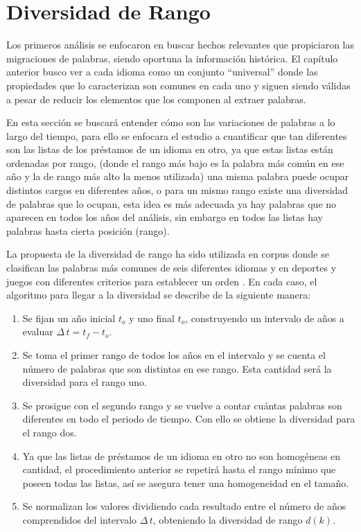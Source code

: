 \chapter{Diversidad de Rango}

Los primeros análisis se enfocaron en buscar hechos relevantes que propiciaron las migraciones de palabras,  siendo oportuna la información histórica.  El capítulo anterior busco ver a cada idioma como un conjunto “universal” donde las propiedades que lo caracterizan  son comunes en cada uno y siguen siendo válidas a pesar de reducir los elementos que los componen al extraer palabras. 

En esta sección se buscará entender cómo son las variaciones de palabras a  lo largo del tiempo, para ello  se enfocara el estudio a cuantificar que tan diferentes son las listas de los préstamos de un idioma en otro,  ya que estas listas están ordenadas por rango, (donde el rango más bajo es la palabra más común en ese año y la de rango más alto la menos utilizada)  una misma palabra puede ocupar distintos cargos en diferentes años,  o  para un mismo rango existe una diversidad de palabras que lo ocupan, esta idea es más adecuada ya hay palabras que no  aparecen en todos los años del análisis,  sin embargo en todos las listas  hay palabras hasta cierta posición (rango).   

La propuesta de la diversidad de rango ha sido utilizada en corpus donde se clasifican las palabras más comunes de seis diferentes idiomas \cite{tesis.sergio} y en deportes y juegos con diferentes criterios para establecer un orden \cite{tesis.jama}. En cada caso,  el algoritmo para llegar a la diversidad se describe de la siguiente manera:


\begin{enumerate}
	
	\item Se fijan un año inicial $t_{o}$ y uno final $t_{o}$, construyendo un intervalo de años a evaluar $\Delta\,t = t_{f}- t_{o}$.
	
	\item Se toma el primer rango de todos los años en el intervalo y se cuenta el número de palabras que son distintas en ese rango. Esta cantidad será la diversidad para el rango uno.
	
	\item Se prosigue con el segundo rango y se vuelve a contar cuántas palabras son diferentes en todo el periodo de tiempo.  Con ello se obtiene la diversidad para el rango dos. 
	
	\item Ya que las listas de préstamos de un idioma en otro no son homogéneas en cantidad, el procedimiento anterior se repetirá hasta el rango mínimo que poseen todas las listas,  así se asegura tener una homogeneidad en el tamaño.
	
	\item Se normalizan  los valores dividiendo cada resultado entre el número de años comprendidos del intervalo $\Delta\,t$, obteniendo  la diversidad de rango $d(k)$.
	
	
\end{enumerate}


